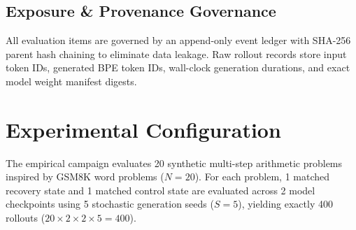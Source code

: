 \documentclass[10pt,conference]{IEEEtran}
\begin{document}
\subsection{Exposure \& Provenance Governance}
All evaluation items are governed by an append-only event ledger with SHA-256 parent hash chaining to eliminate data leakage. Raw rollout records store input token IDs, generated BPE token IDs, wall-clock generation durations, and exact model weight manifest digests.

\section{Experimental Configuration}
The empirical campaign evaluates 20 synthetic multi-step arithmetic problems inspired by GSM8K word problems ($N=20$). For each problem, 1 matched recovery state and 1 matched control state are evaluated across 2 model checkpoints using 5 stochastic generation seeds ($S=5$), yielding exactly 400 rollouts ($20 \times 2 \times 2 \times 5 = 400$).

\begin{table}[htbp]
\caption{Evaluation Design and Provenance Statistics}
\label{tab:provenance}
\centering
{}
\end{table}
\end{document}
